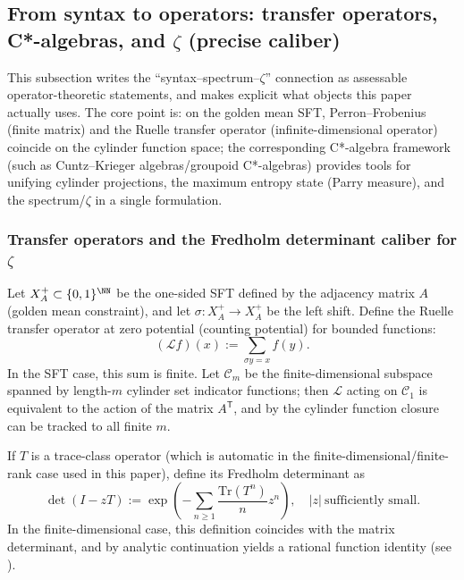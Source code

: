 \subsection{From syntax to operators: transfer operators, C*-algebras, and \texorpdfstring{$\zeta$}{zeta} (precise caliber)}\label{subsec:operator-zeta-interface}

This subsection writes the ``syntax--spectrum--$\zeta$'' connection as assessable operator-theoretic statements, and makes explicit what objects this paper actually uses. The core point is: on the golden mean SFT, Perron--Frobenius (finite matrix) and the Ruelle transfer operator (infinite-dimensional operator) coincide on the cylinder function space; the corresponding C*-algebra framework (such as Cuntz--Krieger algebras/groupoid C*-algebras) provides tools for unifying cylinder projections, the maximum entropy state (Parry measure), and the spectrum/$\zeta$ in a single formulation.

\subsubsection{Transfer operators and the Fredholm determinant caliber for \texorpdfstring{$\zeta$}{zeta}}

Let $X_A^+\subset\{0,1\}^{\NN}$ be the one-sided SFT defined by the adjacency matrix $A$ (golden mean constraint), and let $\sigma:X_A^+\to X_A^+$ be the left shift. Define the Ruelle transfer operator at zero potential (counting potential) for bounded functions:
\[
(\mathcal{L}f)(x):=\sum_{\sigma y=x} f(y).
\]
In the SFT case, this sum is finite. Let $\mathcal{C}_m$ be the finite-dimensional subspace spanned by length-$m$ cylinder set indicator functions; then $\mathcal{L}$ acting on $\mathcal{C}_1$ is equivalent to the action of the matrix $A^{\mathsf T}$, and by the cylinder function closure can be tracked to all finite $m$.

\begin{definition}\label{def:fredholm-determinant}
If $T$ is a trace-class operator (which is automatic in the finite-dimensional/finite-rank case used in this paper), define its Fredholm determinant as
\[
\det(I-zT):=\exp\left(-\sum_{n\ge 1}\frac{\mathrm{Tr}(T^n)}{n}z^n\right),
\quad |z|\ \text{sufficiently small}.
\]
In the finite-dimensional case, this definition coincides with the matrix determinant, and by analytic continuation yields a rational function identity (see \cite{Ruelle1976ZetaExpanding,ParryPollicott1990Zeta}).
\end{definition}

